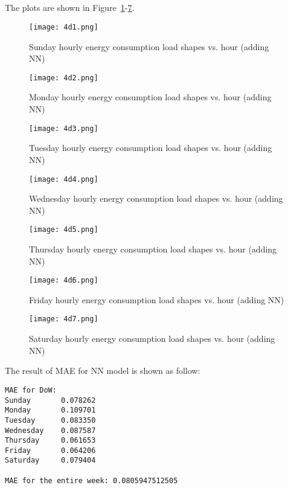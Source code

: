 \documentclass[12pt]{article}
\begin{document}
\subsection{}
The plots are shown in Figure~\ref{fig:4d1}-\ref{fig:4d7}.
\begin{figure}[H]
	\centering
	\texttt{[image: 4d1.png]}
	\vspace{-1cm}      
	\caption{Sunday hourly energy consumption load shapes vs. hour (adding NN)}
	\label{fig:4d1}
\end{figure}
\begin{figure}[H]
	\centering
	\texttt{[image: 4d2.png]}
	\vspace{-1cm}      
	\caption{Monday hourly energy consumption load shapes vs. hour (adding NN)}
	\label{fig:4d2}
\end{figure}
\begin{figure}[H]
	\centering
	\texttt{[image: 4d3.png]}
	\vspace{-1cm}      
	\caption{Tuesday hourly energy consumption load shapes vs. hour (adding NN)}
	\label{fig:4d3}
\end{figure}
\begin{figure}[H]
	\centering
	\texttt{[image: 4d4.png]}
	\vspace{-1cm}      
	\caption{Wednesday hourly energy consumption load shapes vs. hour (adding NN)}
	\label{fig:4d4}
\end{figure}
\begin{figure}[H]
	\centering
	\texttt{[image: 4d5.png]}
	\vspace{-1cm}      
	\caption{Thursday hourly energy consumption load shapes vs. hour (adding NN)}
	\label{fig:4d5}
\end{figure}
\begin{figure}[H]
	\centering
	\texttt{[image: 4d6.png]}
	\vspace{-1cm}      
	\caption{Friday hourly energy consumption load shapes vs. hour (adding NN)}
	\label{fig:4d6}
\end{figure}
\begin{figure}[H]
	\centering
	\texttt{[image: 4d7.png]}
	\vspace{-1cm}      
	\caption{Saturday hourly energy consumption load shapes vs. hour (adding NN)}
	\label{fig:4d7}
\end{figure}
\noindent The result of MAE for NN model is shown as follow:
\begin{verbatim}
MAE for DoW:
Sunday       0.078262
Monday       0.109701
Tuesday      0.083350
Wednesday    0.087587
Thursday     0.061653
Friday       0.064206
Saturday     0.079404

MAE for the entire week: 0.0805947512505
\end{verbatim}
\end{document}

